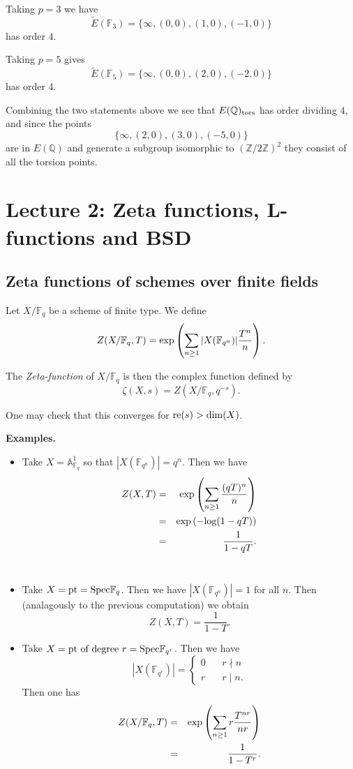 \documentclass[12pt]{amsart}
\numberwithin{equation}{section}
\theoremstyle{remark}
\theoremstyle{definition}
\theoremstyle{definition}
\theoremstyle{definition}
\theoremstyle{definition}
\theoremstyle{definition}
\theoremstyle{definition}
\theoremstyle{definition}
\begin{document}
Taking $p=3$ we have 
\[\tilde{E}(\mathbb{F}_3)=\{\infty,(0,0),(1,0),(-1,0)\}\]
has order $4$. 

Taking $p=5$ gives 
\[\tilde{E}(\mathbb{F}_5)=\{\infty,(0,0),(2,0),(-2,0)\}\]
has order 4. 

Combining the two statements above we see that $E(\mathbb{Q})_\textup{tors}$ has order dividing $4$, and since the points
\[\{\infty,(2,0),(3,0),(-5,0)\}\]
are in $E(\mathbb{Q})$ and generate a subgroup isomorphic to $(\mathbb{Z}/2\mathbb{Z})^2$ they consist of all the torsion points. 

\newpage


\section{Lecture 2: Zeta functions, L-functions and BSD}

\subsection{Zeta functions of schemes over finite fields}

Let $X/\mathbb{F}_q$ be a scheme of finite type. We define
\[Z(X/\mathbb{F}_q,T)=\textup{exp}\left(\sum_{n\geq 1} |X(\mathbb{F}_{q^n})|\frac{T^n}{n}\right).\]

The \textit{Zeta-function} of $X/\mathbb{F}_q$ is then the complex function defined by
\[\zeta(X,s)=Z(X/\mathbb{F}_q,q^{-s}).\] 

One may check that this converges for $\textup{re}(s)>\dim(X)$.

\textbf{Examples.}

\begin{itemize}
\item Take $X=\mathbb{A}^1_{\mathbb{F}_q}$ so that $|X(\mathbb{F}_{q^n})|=q^n$. Then we have
\begin{eqnarray*}
Z(X,T)&=&\textup{exp}\left(\sum_{n\geq 1}\frac{(qT)^n}{n}\right)\\
&=& \textup{exp}\left(-\textup{log}(1-qT)\right)\\
&=& \frac{1}{1-qT}.
\end{eqnarray*}\\
\item Take $X=\textup{pt}=\textup{Spec}\mathbb{F}_q$. Then we have $|X(\mathbb{F}_{q^n})|=1$ for all $n$. Then (analagously to the previous computation) we obtain
\[Z(X,T)=\frac{1}{1-T}.\]
\item Take $X=\textup{pt of degree }r=\textup{Spec}\mathbb{F}_{q^r}$. Then we have
\[|X(\mathbb{F}_{q^r})|=\begin{cases}0~~&~~r \nmid n\\r~~&~~r\mid n.\end{cases}\]
Then one has
\begin{eqnarray*}
Z(X/\mathbb{F}_q,T)&=&\textup{exp}\left(\sum_{n\geq 1} r\frac{T^{nr}}{nr}\right)\\
&=& \frac{1}{1-T^r}.
\end{eqnarray*}
\end{itemize}
\end{document}
